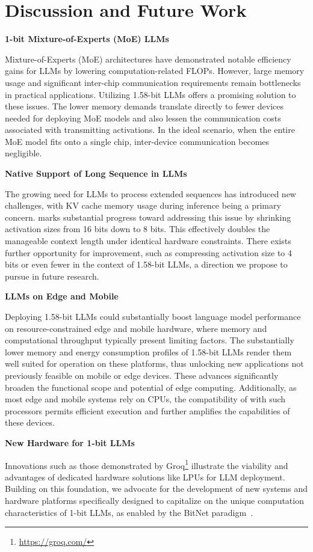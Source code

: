 \section{Discussion and Future Work}

\textbf{1-bit Mixture-of-Experts (MoE) LLMs}

Mixture-of-Experts (MoE) architectures have demonstrated notable efficiency gains for LLMs by lowering computation-related FLOPs. However, large memory usage and significant inter-chip communication requirements remain bottlenecks in practical applications. Utilizing 1.58-bit LLMs offers a promising solution to these issues. The lower memory demands translate directly to fewer devices needed for deploying MoE models and also lessen the communication costs associated with transmitting activations. In the ideal scenario, when the entire MoE model fits onto a single chip, inter-device communication becomes negligible.

\textbf{Native Support of Long Sequence in LLMs}

The growing need for LLMs to process extended sequences has introduced new challenges, with KV cache memory usage during inference being a primary concern.  marks substantial progress toward addressing this issue by shrinking activation sizes from 16 bits down to 8 bits. This effectively doubles the manageable context length under identical hardware constraints. There exists further opportunity for improvement, such as compressing activation size to 4 bits or even fewer in the context of 1.58-bit LLMs, a direction we propose to pursue in future research.

\textbf{LLMs on Edge and Mobile}

Deploying 1.58-bit LLMs could substantially boost language model performance on resource-constrained edge and mobile hardware, where memory and computational throughput typically present limiting factors. The substantially lower memory and energy consumption profiles of 1.58-bit LLMs render them well suited for operation on these platforms, thus unlocking new applications not previously feasible on mobile or edge devices. These advances significantly broaden the functional scope and potential of edge computing. Additionally, as most edge and mobile systems rely on CPUs, the compatibility of  with such processors permits efficient execution and further amplifies the capabilities of these devices.

\textbf{New Hardware for 1-bit LLMs}

Innovations such as those demonstrated by Groq\footnote{\url{https://groq.com/}} illustrate the viability and advantages of dedicated hardware solutions like LPUs for LLM deployment. Building on this foundation, we advocate for the development of new systems and hardware platforms specifically designed to capitalize on the unique computation characteristics of 1-bit LLMs, as enabled by the BitNet paradigm~\cite{bitnet}.